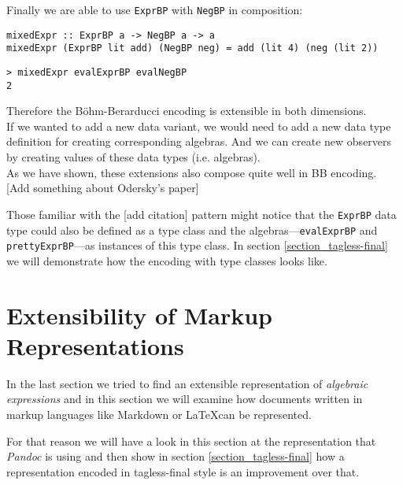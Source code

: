 Finally we are able to use \texttt{ExprBP} with \texttt{NegBP} in composition:

\begin{lstlisting}
mixedExpr :: ExprBP a -> NegBP a -> a
mixedExpr (ExprBP lit add) (NegBP neg) = add (lit 4) (neg (lit 2))
\end{lstlisting}
\begin{lstlisting}
> mixedExpr evalExprBP evalNegBP
2
\end{lstlisting}

Therefore the Böhm-Berarducci encoding is extensible in both dimensions.\\
If we wanted to add a new data variant, we would need to add a new data type
definition for creating corresponding algebras. And we can create new observers
by creating values of these data types (i.e. algebras).\\
As we have shown, these extensions also compose quite well in BB encoding. [Add
something about Odersky’s paper]

Those familiar with the  [add citation] pattern
might notice that the \texttt{ExprBP} data type could also be defined as a type
class and the algebras—\texttt{evalExprBP} and \texttt{prettyExprBP}—as
instances of this type class. In section \ref{section_tagless-final} we will
demonstrate how the encoding with type classes looks like.

%
\clearpage

\section{Extensibility of Markup Representations}
\label{main_section}

In the last section we tried to find an extensible representation of
\emph{algebraic expressions} and in this section we will examine how documents
written in markup languages like Markdown or \LaTeX can be represented.

For that reason we will have a look in this section at the representation that
\emph{Pandoc} is using and then show in section \ref{section_tagless-final} how
a representation encoded in tagless-final style is an improvement over that.

